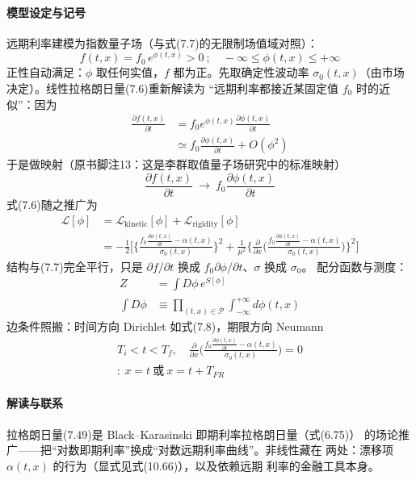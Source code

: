 \paragraph{模型设定与记号}
远期利率建模为指数量子场（与式(7.7)的无限制场值域对照）：
\begin{equation*}
f(t,x)=f_0\,e^{\phi(t,x)}>0\ ;\quad -\infty\leq\phi(t,x)\leq+\infty
\end{equation*}
正性自动满足：$\phi$ 取任何实值，$f$ 都为正。先取确定性波动率
$\sigma_0(t,x)$（由市场决定）。线性拉格朗日量(7.6)重新解读为
“远期利率都接近某固定值 $f_0$ 时的近似”：因为
\begin{align*}
\frac{\partial f(t,x)}{\partial t}
&=f_0e^{\phi(t,x)}\frac{\partial\phi(t,x)}{\partial t}\\
&\simeq f_0\frac{\partial\phi(t,x)}{\partial t}+O(\phi^{2})
\end{align*}
于是做映射（原书脚注13：这是李群取值量子场研究中的标准映射）
\begin{equation*}
\frac{\partial f(t,x)}{\partial t}\ \longrightarrow\
f_0\frac{\partial\phi(t,x)}{\partial t}
\end{equation*}
式(7.6)随之推广为
\begin{align*}
\mathcal{L}[\phi]&=\mathcal{L}_{\mathrm{kinetic}}[\phi]
+\mathcal{L}_{\mathrm{rigidity}}[\phi]\\
&=-\frac{1}{2}\Biggl[\biggl\{\frac{f_0\frac{\partial\phi(t,x)}
{\partial t}-\alpha(t,x)}{\sigma_0(t,x)}\biggr\}^{2}
+\frac{1}{\mu^{2}}\biggl\{\frac{\partial}{\partial x}
\biggl(\frac{f_0\frac{\partial\phi(t,x)}{\partial t}-\alpha(t,x)}
{\sigma_0(t,x)}\biggr)\biggr\}^{2}\Biggr]
\tag{7.49}
\end{align*}
结构与(7.7)完全平行，只是 $\partial f/\partial t$ 换成
$f_0\partial\phi/\partial t$、$\sigma$ 换成 $\sigma_0$。
配分函数与测度：
\begin{align*}
Z&=\int D\phi\,e^{S[\phi]}
\tag{7.50}\\
\int D\phi&\equiv\prod_{(t,x)\in\mathcal{P}}\int_{-\infty}^{+\infty}
d\phi(t,x)
\tag{7.51}
\end{align*}
边条件照搬：时间方向 Dirichlet 如式(7.8)，期限方向 Neumann
\begin{gather*}
T_i<t<T_f,\quad
\frac{\partial}{\partial x}\biggl(\frac{f_0\frac{\partial\phi(t,x)}
{\partial t}-\alpha(t,x)}{\sigma_0(t,x)}\biggr)=0\\
:\ x=t\ \text{或}\ x=t+T_{FR}
\tag{7.52}
\end{gather*}
\paragraph{解读与联系}
拉格朗日量(7.49)是 Black--Karasinski 即期利率拉格朗日量（式(6.75)）
的场论推广——把“对数即期利率”换成“对数远期利率曲线”。非线性藏在
两处：漂移项 $\alpha(t,x)$ 的行为（显式见式(10.66)），以及依赖远期
利率的金融工具本身。

